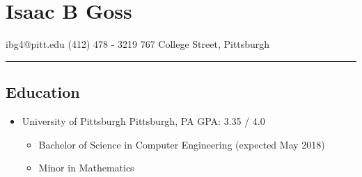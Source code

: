 \documentclass[18pt]{article}
\providecommand{\tightlist}{
    \setlength{\itemsep}{0pt}\setlength{\parskip}{0pt}
}
\begin{document}
  \section*{Isaac B Goss}\label{isaac-b-goss}
    ibg4@pitt.edu \textbar{} (412) 478 - 3219 \textbar{} 767 College Street, Pittsburgh
    
    \hrule
    
    \subsection*{Education}\label{education}
      \begin{itemize}\tightlist
        \item University of Pittsburgh \textbar{} Pittsburgh, PA \textbar{} GPA: 3.35 / 4.0
        \begin{itemize}\tightlist
          \item Bachelor of Science in Computer Engineering (expected May 2018)
          \item Minor in Mathematics
        \end{itemize}
      \end{itemize}
      
\end{document}
